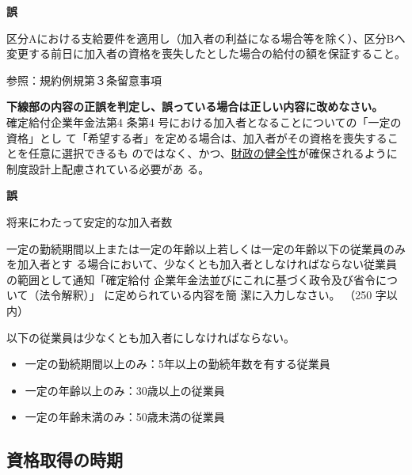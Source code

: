 \begin{answerbox}
  \textbf{誤}

  区分Aにおける支給要件を適用し（加入者の利益になる場合等を除く）、区分Bへ変更する前日に加入者の資格を喪失したとした場合の給付の額を保証すること。
\end{answerbox}

\begin{explanationbox}
  参照：規約例規第３条留意事項
\end{explanationbox}

\begin{truefalse}[年金1 2022 問題1(3)ウ]

    \textbf{下線部の内容の正誤を判定し、誤っている場合は正しい内容に改めなさい。}
  \\

  確定給付企業年金法第4 条第4 号における加入者となることについての「一定の資格」とし
て「希望する者」を定める場合は、加入者がその資格を喪失することを任意に選択できるも
のではなく、かつ、\underline{財政の健全性}が確保されるように制度設計上配慮されている必要があ
る。
\end{truefalse}

\begin{answerbox}
    \textbf{誤}

    将来にわたって安定的な加入者数
\end{answerbox}

\begin{shortanswer}[年金1 2025 問題2(1)エ]
  一定の勤続期間以上または一定の年齢以上若しくは一定の年齢以下の従業員のみを加入者とす
る場合において、少なくとも加入者としなければならない従業員の範囲として通知「確定給付
企業年金法並びにこれに基づく政令及び省令について（法令解釈）」 に定められている内容を簡
潔に入力しなさい。 （250 字以内）
\end{shortanswer}

\begin{answerbox}
  以下の従業員は少なくとも加入者にしなければならない。
  \begin{itemize}
    \item 一定の勤続期間以上のみ：5年以上の勤続年数を有する従業員
    \item 一定の年齢以上のみ：30歳以上の従業員
    \item 一定の年齢未満のみ：50歳未満の従業員
  \end{itemize}
\end{answerbox}

\newpage

\subsection{資格取得の時期}

